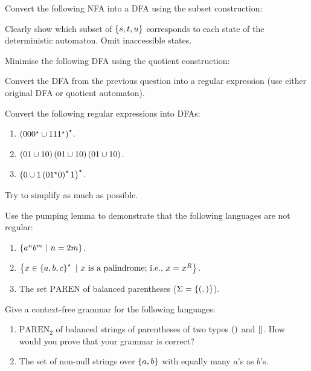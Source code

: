 \documentclass{article}
\begin{document}
\begin{question}
Convert the following NFA into a DFA using the subset construction:


Clearly show which subset of $\left\{ s,t,u \right\}$ corresponds to each state of the deterministic automaton. Omit inaccessible states.
\begin{answer}
\end{answer}
\end{question}
\begin{question}
Minimise the following DFA using the quotient construction:
\begin{answer}
\end{answer}
\end{question}
\begin{question}
Convert the DFA from the previous question into a regular expression (use either original DFA or quotient automaton).
\begin{answer}
\end{answer}
\end{question}
\begin{question}
Convert the following regular expressions into DFAs:
\begin{enumerate}
 \item $\left( 000^{\star}\cup 111^{\star} \right)^{\star}$.
 \item $\left( 01\cup 10 \right)\left( 01\cup 10 \right)\left( 01\cup 10 \right)$.
 \item $\left( 0\cup 1\left( 01^{\star}0 \right)^{\star}1 \right)^{\star}$.
\end{enumerate}
Try to simplify as much as possible.
\begin{answer}
\end{answer}
\end{question}
\begin{question}
Use the pumping lemma to demonstrate that the following languages are not regular:
\begin{enumerate}
 \item $\left\{ a^nb^m\ |\ n = 2m \right\}$.
 \item $\left\{ x\in\left\{ a,b,c \right\}^{\star}\ |\ \mbox{$x$ is a palindrome; i.e., $x=x^R$} \right\}$.
 \item The set $\mbox{PAREN}$ of balanced parentheses ($\Sigma=\left\{ (,) \right\}$).
\end{enumerate}
\begin{answer}
\end{answer}
\end{question}
\begin{question}
Give a context-free grammar for the following languages:
\begin{enumerate}
 \item $\mbox{PAREN}_2$ of balanced strings of parentheses of two types $\left(  \right)$ and $\left[  \right]$. How would you prove that your grammar is correct?
 \item The set of non-null strings over $\left\{ a,b \right\}$ with equally many $a$'s as $b$'s.
\end{enumerate}
\begin{answer}
\end{answer}
\end{question}
\end{document}
